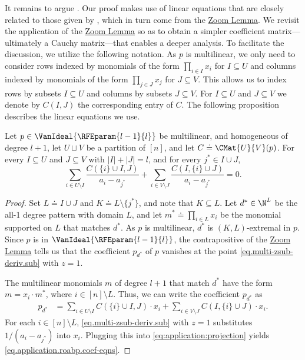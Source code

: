 \documentclass{toc}
\begin{document}
It remains to argue . Our proof makes use of linear equations that are closely related to those given by , which in turn come from the \hyperref[lem.multi-zsub-deriv]{Zoom Lemma}. We revisit the application of the \hyperref[lem.multi-zsub-deriv]{Zoom Lemma} so as to obtain a simpler coefficient matrix---ultimately a Cauchy matrix---that enables a deeper analysis. To facilitate the discussion, we utilize the following notation. As $p$ is multilinear, we only need to consider rows indexed by monomials of the form $\prod_{i \in I} x_i$ for $I \subseteq U$ and columns indexed by monomials of the form $\prod_{j \in J} x_j$ for $J \subseteq V$. This allows us to index rows by subsets $I \subseteq U$ and columns by subsets $J \subseteq V$. For $I \subseteq U$ and $J \subseteq V$ we denote by $C(I,J)$ the corresponding entry of $C$. The following proposition describes the linear equations we use.
\begin{proposition}
  \label{prop.application.roabp.coef-eqns}
  Let \(p\in\VanIdeal{\RFEparam{l-1}{l}}\) be multilinear,
  and homogeneous of degree \(l+1\),
  let \(U\sqcup V\) be a partition of \([n]\),
  and let $C \doteq \CMat{U}{V}(p)$.
  For every \(I\subseteq U\) and \(J\subseteq V\)
  with \(|I|+|J|=l\),
  and for every \(j^*\in I\cup J\),
  \begin{equation}
    \label{eq.application.roabp.coef-eqns}
    \sum_{i\in U\setminus I}
      \frac{C(\{i\}\cup I, J)}%
        {a_i - a_{j^*}}
    +
    \sum_{i\in V\setminus J}
      \frac{C(I,\{i\}\cup J)}%
        {a_i - a_{j^*}}
    =0.
  \end{equation}
\end{proposition}
\begin{proof}
  Set
  $L \doteq I \cup J$ and
  $K \doteq L \setminus \{j^*\}$,
  and note that \(K \subseteq L\).
  Let \(d^* \in \N^L\) be the all-1 degree pattern with domain \(L\),
  and let \({m}^* \doteq \prod_{i\in L} x_i\)
  be the monomial supported on \(L\) that matches \(d^*\).
  As $p$ is multilinear,
  $d^*$ is $(K,L)$-extremal in $p$.
  Since \(p\) is in \(\VanIdeal{\RFEparam{l-1}{l}}\),
  the contrapositive of the \hyperref[lem.multi-zsub-deriv]{Zoom Lemma} tells us that the
  coefficient \(p_{d^*}\) of \(p\) vanishes at the point
  \eqref{eq.multi-zsub-deriv.sub} with $z=1$.

  The multilinear monomials $m$ of degree $l+1$ that match
  \(d^*\) have the form $m = x_i \cdot {m}^*$,
  where $i \in [n] \setminus L$.
  Thus, we can write the coefficient \(p_{d^*}\) as
  \begin{align}\label{eq:application:projection}
    p_{d^*}
    & =
    \sum_{i \in U\setminus I} C(\{i\} \cup I,J) \cdot x_i +
    \sum_{i \in V\setminus J} C(I,\{i\} \cup J) \cdot x_i.
  \end{align}
  For each \(i \in [n]\setminus L\),
  \eqref{eq.multi-zsub-deriv.sub} with $z=1$ substitutes $1/(a_i - a_{j^*})$
  into \(x_i\).
  Plugging this into \eqref{eq:application:projection} yields
  \eqref{eq.application.roabp.coef-eqns}.
\end{proof}
\end{document}
